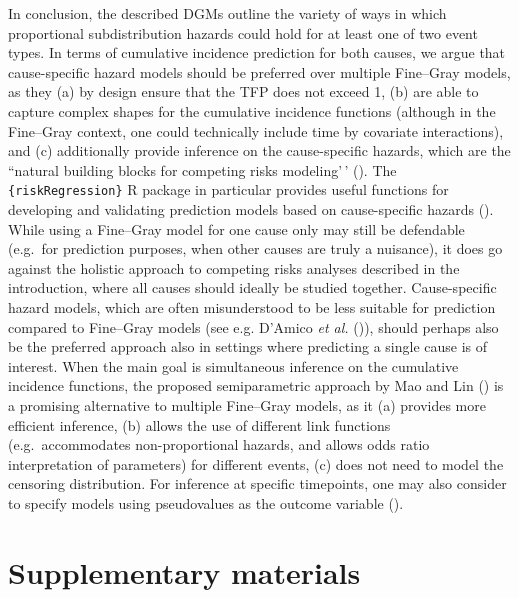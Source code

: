 \documentclass[
  letterpaper,
  DIV=11,
  numbers=noendperiod]{scrreprt}
\begin{document}
In conclusion, the described DGMs outline the variety of ways in which
proportional subdistribution hazards could hold for at least one of two
event types. In terms of cumulative incidence prediction for both
causes, we argue that cause-specific hazard models should be preferred
over multiple Fine--Gray models, as they (a) by design ensure that the
TFP does not exceed 1, (b) are able to capture complex shapes for the
cumulative incidence functions (although in the Fine--Gray context, one
could technically include time by covariate interactions), and (c)
additionally provide inference on the cause-specific hazards, which are
the ``natural building blocks for competing risks modeling'\,'
(). The \texttt{\{riskRegression\}} R package in particular
provides useful functions for developing and validating prediction
models based on cause-specific hazards
(). While using a
Fine--Gray model for one cause only may still be defendable (e.g.~for
prediction purposes, when other causes are truly a nuisance), it does go
against the holistic approach to competing risks analyses described in
the introduction, where all causes should ideally be studied together.
Cause-specific hazard models, which are often misunderstood to be less
suitable for prediction compared to Fine--Gray models (see e.g. D'Amico
\emph{et al.} ()),
should perhaps also be the preferred approach also in settings where
predicting a single cause is of interest. When the main goal is
simultaneous inference on the cumulative incidence functions, the
proposed semiparametric approach by Mao and Lin
() is a
promising alternative to multiple Fine--Gray models, as it (a) provides
more efficient inference, (b) allows the use of different link functions
(e.g.~accommodates non-proportional hazards, and allows odds ratio
interpretation of parameters) for different events, (c) does not need to
model the censoring distribution. For inference at specific timepoints,
one may also consider to specify models using pseudovalues as the
outcome variable
().

\section*{Supplementary materials}\label{supplementary-materials-4}
\end{document}
